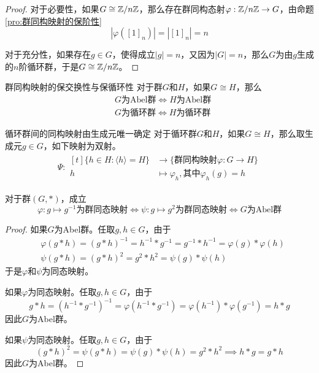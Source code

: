 \begin{proof}
	对于必要性，如果$G\cong \mathbb{Z}/n\mathbb{Z}$，那么存在群同构态射$\varphi:\mathbb{Z}/n\mathbb{Z}\to G$，由命题\ref{pro:群同构映射的保阶性}
	$$
	|\varphi([1]_n)|=|[1]_n|=n
	$$
	
	对于充分性，如果存在$g\in G$，使得成立$|g|=n$，又因为$|G|=n$，那么$G$为由$g$生成的$n$阶循环群，于是$G\cong \mathbb{Z}/n\mathbb{Z}$。
\end{proof}

\begin{proposition}{群同构映射的保交换性与保循环性}
	对于群$G$和$H$，如果$G\cong H$，那么
	\begin{align*}
		&G \text{为Abel群}\iff
		H \text{为Abel群}\\
		&G \text{为循环群}\iff
		H \text{为循环群}
	\end{align*}
\end{proposition}

\begin{proposition}{循环群间的同构映射由生成元唯一确定}
	对于循环群$G$和$H$，如果$G\cong H$，那么取生成元$g\in G$，如下映射为双射。
	\begin{align*}
		\Psi:\begin{aligned}[t]
			\{ h\in H:\langle h \rangle =H \}&\longrightarrow \{ \text{群同构映射}\varphi:G\to H \}\\
			h&\longmapsto \varphi_h,\text{其中}\varphi_h(g)=h
		\end{aligned}
	\end{align*}
\end{proposition}

\begin{proposition}
	对于群$(G,*)$，成立
	$$
	\varphi:g\mapsto g^{-1}\text{为群同态映射}\iff
	\psi:g\mapsto g^2\text{为群同态映射}\iff
	G\text{为Abel群}
	$$
\end{proposition}

\begin{proof}
	如果$G$为Abel群。任取$g,h\in G$，由于
	\begin{align*}
		&\varphi(g*h)=(g*h)^{-1}=h^{-1}*g^{-1}=g^{-1}*h^{-1}=\varphi(g)*\varphi(h)\\
		&\psi(g*h)=(g*h)^2=g^2*h^2=\psi(g)*\psi(h)
	\end{align*}
	于是$\varphi$和$\psi$为同态映射。
	
	如果$\varphi$为同态映射。任取$g,h\in G$，由于
	\[ 
	g*h=(h^{-1}*g^{-1})^{-1}=\varphi(h^{-1}*g^{-1})=\varphi(h^{-1})*\varphi(g^{-1})=h*g
	 \]
	 因此$G$为Abel群。
	 
	 如果$\psi$为同态映射。任取$g,h\in G$，由于
	 \[ 
	 (g*h)^2=\psi(g*h)=\psi(g)*\psi(h)=g^2*h^2\implies h*g=g*h
	 \]
	 因此$G$为Abel群。
\end{proof}

